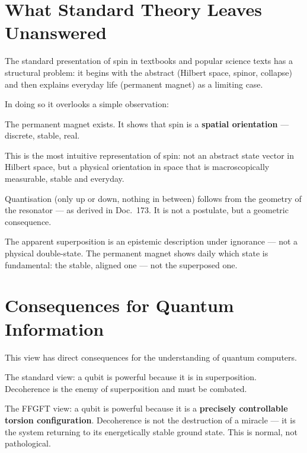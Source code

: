 \section{What Standard Theory Leaves Unanswered}
\label{sec:unanswered}

The standard presentation of spin in textbooks and
popular science texts has a structural problem:
it begins with the abstract (Hilbert space, spinor, collapse)
and then explains everyday life (permanent magnet) as a limiting case.

In doing so it overlooks a simple observation:

\begin{significance}
The permanent magnet exists.
It shows that spin is a \textbf{spatial orientation} ---
discrete, stable, real.

This is the most intuitive representation of spin:
not an abstract state vector in Hilbert space,
but a physical orientation in space
that is macroscopically measurable, stable and everyday.

Quantisation (only up or down, nothing in between)
follows from the geometry of the resonator --- as derived in Doc.~173.
It is not a postulate, but a geometric consequence.

The apparent superposition is an epistemic description
under ignorance --- not a physical double-state.
The permanent magnet shows daily which state is fundamental:
the stable, aligned one --- not the superposed one.
\end{significance}

\section{Consequences for Quantum Information}
\label{sec:qi-consequences}

This view has direct consequences for the understanding
of quantum computers.

The standard view: a qubit is powerful because it is in superposition.
Decoherence is the enemy of superposition and must be combated.

The FFGFT view: a qubit is powerful because it is a
\textbf{precisely controllable torsion configuration}.
Decoherence is not the destruction of a miracle ---
it is the system returning to its energetically stable
ground state. This is normal, not pathological.

